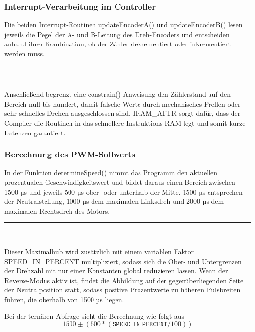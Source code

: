 \documentclass[a4paper,12pt]{article}
\begin{document}
\subsubsection{Interrupt-Verarbeitung im Controller}
Die beiden Interrupt-Routinen updateEncoderA() und updateEncoderB() lesen jeweils die Pegel der A- und B-Leitung des Dreh-Encoders und entscheiden anhand ihrer Kombination, ob der Zähler dekrementiert oder inkrementiert werden muss. 
\newline\noindent\rule{\linewidth}{0.4pt}  %

\noindent\rule{\linewidth}{0.4pt}\\[0.5em]  %
Anschließend begrenzt eine constrain()-Anweisung den Zählerstand auf den Bereich null bis hundert, damit falsche Werte durch mechanisches Prellen oder sehr schnelles Drehen ausgeschlossen sind. IRAM\_ATTR\cite{espidf_memory_iram} sorgt dafür, dass der Compiler die Routinen in das schnellere Instruktions-RAM legt und somit kurze Latenzen garantiert.

\subsubsection{Berechnung des PWM-Sollwerts}
In der Funktion determineSpeed() nimmt das Programm den aktuellen prozentualen Geschwindigkeitswert und bildet daraus einen Bereich zwischen 1500 µs und jeweils 500 µs ober- oder unterhalb der Mitte. 1500 µs entsprechen der Neutralstellung, 1000 µs dem maximalen Linksdreh und 2000 µs dem maximalen Rechtsdreh des Motors.
\newline\noindent\rule{\linewidth}{0.4pt}  %

\noindent\rule{\linewidth}{0.4pt}\\[0.5em]  %
Dieser Maximalhub wird zusätzlich mit einem variablen Faktor SPEED\_IN\_PERCENT multipliziert, sodass sich die Ober- und Untergrenzen der Drehzahl mit nur einer Konstanten global reduzieren lassen. Wenn der Reverse-Modus aktiv ist, findet die Abbildung auf der gegenüberliegenden Seite der Neutralposition statt, sodass positive Prozentwerte zu höheren Pulsbreiten führen, die oberhalb von 1500 µs liegen. \newline

Bei der ternären Abfrage sieht die Berechnung wie folgt aus:
\begin{equation}
    1500 \pm (500*(\texttt{SPEED\_IN\_PERCENT}/100))
\end{equation}
\end{document}

